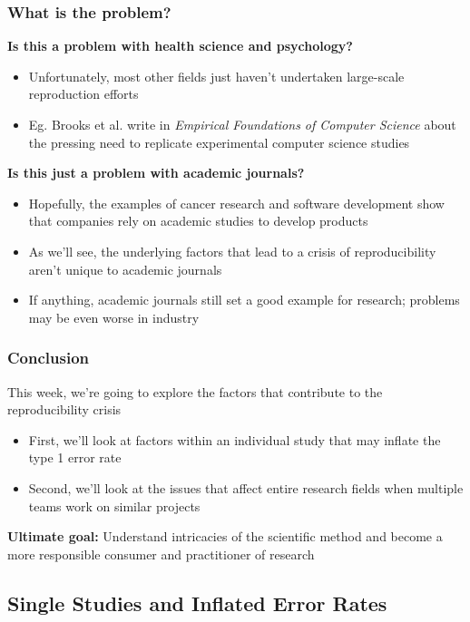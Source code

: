 \documentclass[10pt, block=fill]{beamer}
\begin{document}
\begin{frame}
  \frametitle{What is the problem?}
  
  \textbf{Is this a problem with health science and psychology?}
  \begin{itemize}
      \item Unfortunately, most other fields just haven't undertaken large-scale reproduction efforts
      \item Eg. Brooks et al. write in \textit{Empirical Foundations of Computer Science} about the pressing need to replicate experimental computer science studies
  \end{itemize}
  
  \textbf{Is this just a problem with academic journals?}
  \begin{itemize}
      \item Hopefully, the examples of cancer research and software development show that companies rely on academic studies to develop products
      \item As we'll see, the underlying factors that lead to a crisis of reproducibility aren't unique to academic journals
      \item If anything, academic journals still set a good example for research; problems may be even worse in industry
  \end{itemize}
    
\end{frame}


\begin{frame}
  \frametitle{Conclusion}

This week, we're going to explore the factors that contribute to the reproducibility crisis

  \begin{itemize}
    \item First, we'll look at factors within an individual study that may inflate the type 1 error rate
    \item Second, we'll look at the issues that affect entire research fields when multiple teams work on similar projects
  \end{itemize}
  
  \textbf{Ultimate goal:} Understand intricacies of the scientific method and become a more responsible consumer and practitioner of research
\end{frame}



\subsection{Single Studies and Inflated Error Rates}
\end{document}
